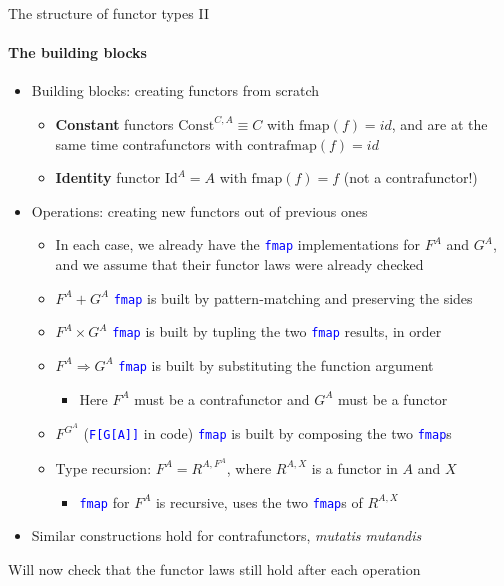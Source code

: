 \documentclass[english]{beamer}
\begin{document}
\begin{frame}{The structure of functor types II}

\framesubtitle{The building blocks}
\begin{itemize}
\item Building blocks: creating functors from scratch
\begin{itemize}
\item \textbf{Constant} functors $\text{Const}^{C,A}\equiv C$ with $\text{fmap}(f)=id$,
and are at the same time contrafunctors with $\text{contrafmap}(f)=id$
\item \textbf{Identity} functor $\text{Id}^{A}=A$ with $\text{fmap}(f)=f$
(not a contrafunctor!)
\end{itemize}
\item Operations: creating new functors out of previous ones
\begin{itemize}
\item In each case, we already have the \texttt{\textcolor{blue}{\footnotesize{}fmap}}
implementations for $F^{A}$ and $G^{A}$, and we assume that their
functor laws were already checked 
\item $F^{A}+G^{A}$ \textendash{} \texttt{\textcolor{blue}{\footnotesize{}fmap}}
is built by pattern-matching and preserving the sides
\item $F^{A}\times G^{A}$ \textendash{} \texttt{\textcolor{blue}{\footnotesize{}fmap}}
is built by tupling the two \texttt{\textcolor{blue}{\footnotesize{}fmap}}
results, in order
\item $F^{A}\Rightarrow G^{A}$ \textendash{} \texttt{\textcolor{blue}{\footnotesize{}fmap}}
is built by substituting the function argument
\begin{itemize}
\item Here $F^{A}$ must be a contrafunctor and $G^{A}$ must be a functor
\end{itemize}
\item $F^{G^{A}}$ (\texttt{\textcolor{blue}{\footnotesize{}F{[}G{[}A{]}{]}}}
in code) \textendash{} \texttt{\textcolor{blue}{\footnotesize{}fmap}}
is built by composing the two \texttt{\textcolor{blue}{\footnotesize{}fmap}}s
\item Type recursion: $F^{A}=R^{A,F^{A}}$, where $R^{A,X}$ is a functor
in $A$ and $X$
\begin{itemize}
\item \texttt{\textcolor{blue}{\footnotesize{}fmap}} for $F^{A}$ is recursive,
uses the two \texttt{\textcolor{blue}{\footnotesize{}fmap}}s of $R^{A,X}$
\end{itemize}
\end{itemize}
\item Similar constructions hold for contrafunctors, \emph{mutatis mutandis}
\end{itemize}
Will now check that the functor laws still hold after each operation
\end{frame}
\end{document}
